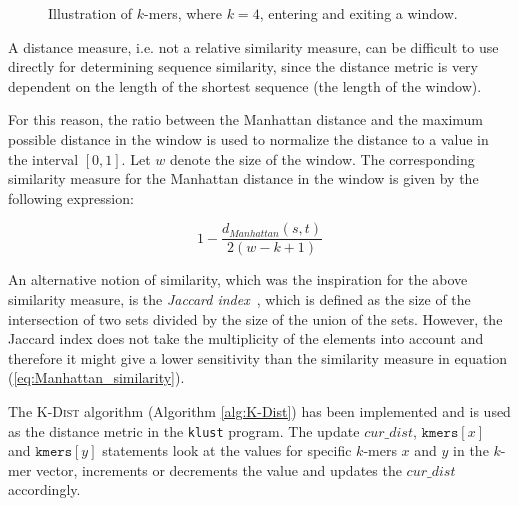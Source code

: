 \begin{figure}[H]
\centering
{}
\caption{Illustration of $k$-mers, where $k=4$, entering and exiting a window.}
\label{fig:d2_forward_differences}
\end{figure}

A distance measure, i.e. not a relative similarity measure, can be difficult
to use directly for determining sequence similarity, since the distance metric
is very dependent on the length of the shortest sequence (the length of the
window).

For this reason, the ratio between the Manhattan distance and the maximum
possible distance in the window is used to normalize the distance to a value in
the interval $[0,1]$. Let $w$ denote the size of the window. The corresponding
similarity measure for the Manhattan distance in the window is given by the
following expression:

\begin{equation}
  1 - \frac{d_{Manhattan}(s,t)}{2(w - k + 1)} \label{eq:Manhattan_similarity}
\end{equation}

An alternative notion of similarity, which was the inspiration for the above
similarity measure, is the \emph{Jaccard index}~\cite{jaccard1912}, which is
defined as the size of the intersection of two sets divided by the size of the
union of the sets.  However, the Jaccard index does not take the multiplicity
of the elements into account and therefore it might give a lower sensitivity
than the similarity measure in equation (\ref{eq:Manhattan_similarity}).

The \textsc{K-Dist} algorithm (Algorithm \ref{alg:K-Dist}) has been
implemented and is used as the distance metric in the \texttt{klust} program.
The update $cur\_dist$, $\mathtt{kmers}[x]$ and $\mathtt{kmers}[y]$ statements
look at the values for specific $k$-mers $x$ and $y$ in the $k$-mer vector,
increments or decrements the value and updates the $cur\_dist$ accordingly.


